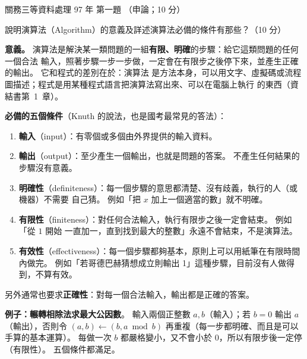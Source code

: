 \begin{pastexam}[label={px:gw3-097-ds-01}]{關務三等資料處理 97 年 第一題}
（申論；10 分）

說明演算法（Algorithm）的意義及詳述演算法必備的條件有那些？（10 分）
\end{pastexam}

\begin{pastsoln}
\textbf{意義。} 演算法是解決某一類問題的一組\textbf{有限、明確}的步驟：給它這類問題的任何一個合法
輸入，照著步驟一步一步做，一定會在有限步之後停下來，並產生正確的輸出。 它和程式的差別在於：演算法
是方法本身，可以用文字、虛擬碼或流程圖描述；程式是用某種程式語言把演算法寫出來、可以在電腦上執行
的東西（資結書第~1~章）。

\textbf{必備的五個條件}（Knuth 的說法，也是國考最常見的答法）：
\begin{enumerate}[nosep]
\item \textbf{輸入}（input）：有零個或多個由外界提供的輸入資料。
\item \textbf{輸出}（output）：至少產生一個輸出，也就是問題的答案。 不產生任何結果的步驟沒有意義。
\item \textbf{明確性}（definiteness）：每一個步驟的意思都清楚、沒有歧義，執行的人（或機器）不需要
自己猜。 例如「把 $x$ 加上一個適當的數」就不明確。
\item \textbf{有限性}（finiteness）：對任何合法輸入，執行有限步之後一定會結束。 例如「從 $1$ 開始
一直加一，直到找到最大的整數」永遠不會結束，不是演算法。
\item \textbf{有效性}（effectiveness）：每一個步驟都夠基本，原則上可以用紙筆在有限時間內做完。
例如「若哥德巴赫猜想成立則輸出 1」這種步驟，目前沒有人做得到，不算有效。
\end{enumerate}
另外通常也要求\textbf{正確性}：對每一個合法輸入，輸出都是正確的答案。

\textbf{例子：輾轉相除法求最大公因數}。 輸入兩個正整數 $a, b$（輸入）；若 $b = 0$ 輸出 $a$
（輸出），否則令 $(a, b) \gets (b, a \bmod b)$ 再重複（每一步都明確、而且是可以手算的基本運算）。
每做一次 $b$ 都嚴格變小，又不會小於 $0$，所以有限步後一定停（有限性）。 五個條件都滿足。
\end{pastsoln}
